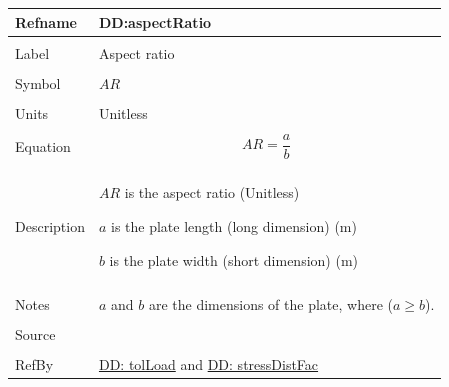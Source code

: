 \documentclass[12pt]{article}
\begin{document}
\vspace{\baselineskip}
\noindent
\begin{minipage}{\textwidth}
\begin{tabular}{>{\raggedright}p{}>{\raggedright\arraybackslash}p{}}
\toprule \textbf{Refname} & \textbf{DD:aspectRatio}
\label{DD:aspectRatio}
\\ \midrule \\
Label & Aspect ratio
        
\\ \midrule \\
Symbol & $AR$
         
\\ \midrule \\
Units & Unitless
        
\\ \midrule \\
Equation & \begin{displaymath}
           AR=\frac{a}{b}
           \end{displaymath}
\\ \midrule \\
Description & \begin{symbDescription}
              \item{$AR$ is the aspect ratio (Unitless)}
              \item{$a$ is the plate length (long dimension) (m)}
              \item{$b$ is the plate width (short dimension) (m)}
              \end{symbDescription}
\\ \midrule \\
Notes & $a$ and $b$ are the dimensions of the plate, where ($a\geq{}b$).
        
\\ \midrule \\
Source & \cite{astm2009}
         
\\ \midrule \\
RefBy & \hyperref[DD:tolLoad]{DD: tolLoad} and \hyperref[DD:stressDistFac]{DD: stressDistFac}
        
\\ \bottomrule
\end{tabular}
\end{minipage}
\end{document}
